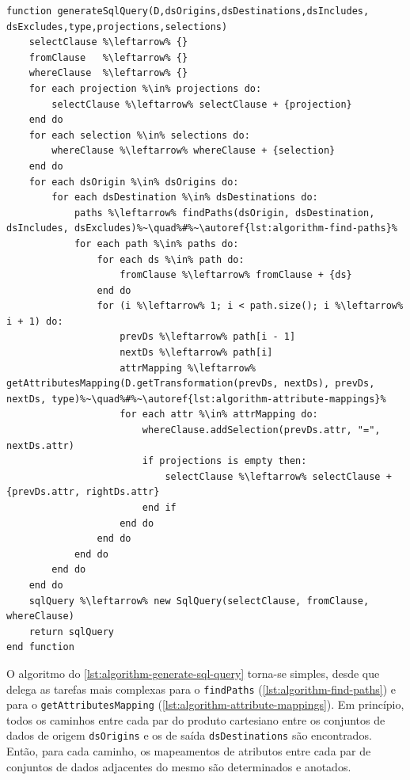 \begin{minipage}[c]{0.95\textwidth}
\begin{lstlisting}[language=pseudocode,label={lst:algorithm-generate-sql-query},caption={[Geração da consulta em SQL]Geração da consulta na linguagem SQL a partir das especificações do usuário.}]
function generateSqlQuery(D,dsOrigins,dsDestinations,dsIncludes, dsExcludes,type,projections,selections)
    selectClause %\leftarrow% {}
    fromClause   %\leftarrow% {}
    whereClause  %\leftarrow% {}
    for each projection %\in% projections do:
        selectClause %\leftarrow% selectClause + {projection}
    end do
    for each selection %\in% selections do:
        whereClause %\leftarrow% whereClause + {selection}
    end do
    for each dsOrigin %\in% dsOrigins do:
        for each dsDestination %\in% dsDestinations do:
            paths %\leftarrow% findPaths(dsOrigin, dsDestination, dsIncludes, dsExcludes)%~\quad%#%~\autoref{lst:algorithm-find-paths}%
            for each path %\in% paths do:
                for each ds %\in% path do:
                    fromClause %\leftarrow% fromClause + {ds}
                end do                
                for (i %\leftarrow% 1; i < path.size(); i %\leftarrow% i + 1) do:
                    prevDs %\leftarrow% path[i - 1]
                    nextDs %\leftarrow% path[i]
                    attrMapping %\leftarrow% getAttributesMapping(D.getTransformation(prevDs, nextDs), prevDs, nextDs, type)%~\quad%#%~\autoref{lst:algorithm-attribute-mappings}%
                    for each attr %\in% attrMapping do:
                        whereClause.addSelection(prevDs.attr, "=", nextDs.attr)
                        if projections is empty then:
                            selectClause %\leftarrow% selectClause + {prevDs.attr, rightDs.attr}
                        end if
                    end do
                end do
            end do
        end do
    end do
    sqlQuery %\leftarrow% new SqlQuery(selectClause, fromClause, whereClause)
    return sqlQuery
end function
\end{lstlisting}
\end{minipage}

O algoritmo do \autoref{lst:algorithm-generate-sql-query} torna-se simples, desde que delega as tarefas mais complexas para o \texttt{findPaths} (\autoref{lst:algorithm-find-paths}) e para o \texttt{getAttributesMapping} (\autoref{lst:algorithm-attribute-mappings}). Em princípio, todos os caminhos entre cada par do produto cartesiano entre os conjuntos de dados de origem \texttt{dsOrigins} e os de saída \texttt{dsDestinations} são encontrados. Então, para cada caminho, os mapeamentos de atributos entre cada par de conjuntos de dados adjacentes do mesmo são determinados e anotados.

